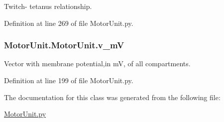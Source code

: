 Twitch-\/ tetanus relationship. 



Definition at line 269 of file Motor\+Unit.\+py.

\subsubsection[{\texorpdfstring{v\+\_\+mV}{v_mV}}]{\setlength{\rightskip}{0pt plus 5cm}Motor\+Unit.\+Motor\+Unit.\+v\+\_\+mV}\hypertarget{class_motor_unit_1_1_motor_unit_aa8968f89250895ae2ae572e9106709f2}{}\label{class_motor_unit_1_1_motor_unit_aa8968f89250895ae2ae572e9106709f2}


Vector with membrane potential,in mV, of all compartments. 



Definition at line 199 of file Motor\+Unit.\+py.



The documentation for this class was generated from the following file\+:\begin{DoxyCompactItemize}
\item 
\hyperlink{_motor_unit_8py}{Motor\+Unit.\+py}\end{DoxyCompactItemize}
